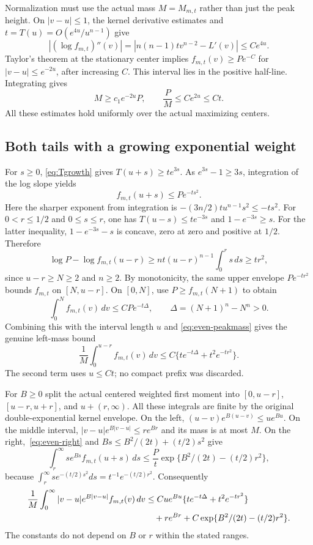 \documentclass[11pt]{article}
\begin{document}
Normalization must use the actual mass $M=M_{m,t}$ rather than just
the peak height. On $|v-u|\leq1$, the kernel derivative estimates and
$t=T(u)=O(e^{4u}/u^{n-1})$ give
\[
 |(\log f_{m,t})''(v)|
 =|n(n-1)tv^{n-2}-L'(v)|\leq C e^{4u}.
\]
Taylor's theorem at the stationary center implies
$f_{m,t}(v)\geq Pe^{-C}$ for $|v-u|\leq e^{-2u}$, after increasing
$C$. This interval lies in the positive half-line. Integrating gives
\begin{equation}\label{eq:even-peakmass}
 M\geq c_1 e^{-2u}P,\qquad \frac{P}{M}\leq C e^{2u}\leq Ct.
\end{equation}
All these estimates hold uniformly over the actual maximizing centers.

\subsection{Both tails with a growing exponential weight}
For $s\geq0$, \eqref{eq:Tgrowth} gives $T(u+s)\geq te^{3s}$.
As $e^{3s}-1\geq3s$, integration of the log slope yields
\begin{equation}\label{eq:even-right}
 f_{m,t}(u+s)\leq P e^{-ts^2}.
\end{equation}
Here the sharper exponent from integration is
$-(3n/2)tu^{n-1}s^2\leq-ts^2$. For $0<r\leq1/2$ and $0\leq s\leq r$,
one has $T(u-s)\leq te^{-3s}$ and $1-e^{-3s}\geq s$.
For the latter inequality, $1-e^{-3s}-s$ is concave, zero at zero
and positive at $1/2$. Therefore
\[
 \log P-\log f_{m,t}(u-r)
 \geq n t(u-r)^{n-1}\int_0^r s\,ds\geq tr^2,
\]
since $u-r\geq N\geq2$ and $n\geq2$. By monotonicity, the same
upper envelope $Pe^{-tr^2}$ bounds $f_{m,t}$ on $[N,u-r]$.
On $[0,N]$, use $P\geq f_{m,t}(N+1)$ to obtain
\[
 \int_0^N f_{m,t}(v)\,dv\leq CP e^{-t\Delta},\qquad
 \Delta=(N+1)^n-N^n>0.
\]
Combining this with the interval length $u$ and
\eqref{eq:even-peakmass} gives the genuine left-mass bound
\begin{equation}\label{eq:even-leftmass}
 \frac1M\int_0^{u-r}f_{m,t}(v)\,dv
 \leq C\{te^{-t\Delta}+t^2e^{-tr^2}\}.
\end{equation}
The second term uses $u\leq Ct$; no compact prefix was discarded.

For $B\geq0$ split the actual centered weighted first moment into
$[0,u-r]$, $[u-r,u+r]$, and $u+(r,\infty)$. All these integrals
are finite by the original double-exponential kernel envelope.
On the left, $(u-v)e^{B(u-v)}\leq u e^{Bu}$.
On the middle interval, $|v-u|e^{B|v-u|}\leq r e^{Br}$ and its
mass is at most $M$. On the right,~\eqref{eq:even-right} and
$Bs\leq B^2/(2t)+(t/2)s^2$ give
\[
 \int_r^\infty s e^{Bs}f_{m,t}(u+s)\,ds
 \leq \frac Pt\exp\{B^2/(2t)-(t/2)r^2\},
\]
because $\int_r^\infty s e^{-(t/2)s^2}ds=t^{-1}e^{-(t/2)r^2}$.
Consequently
\begin{align}\label{eq:even-moment}
 \frac1M\int_0^\infty |v-u|e^{B|v-u|}f_{m,t}(v)\,dv
 &\leq C u e^{Bu}\{te^{-t\Delta}+t^2e^{-tr^2}\}\notag\\
 &\quad+r e^{Br}+C\exp\{B^2/(2t)-(t/2)r^2\}.
\end{align}
The constants do not depend on $B$ or $r$ within the stated ranges.
\end{document}
